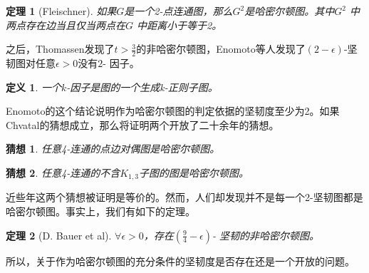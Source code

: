 \documentclass[a4paper,11pt]{book}
\newtheorem{theorem}{\textbf{定理}}[section]
\newtheorem{defination}{\textbf{定义}}[section]
\newtheorem{guess}{\textbf{猜想}}[section]
\begin{document}
\begin{theorem}[Fleischner] \K 如果$G$是一个2-点连通图，那么$G^2$是哈密尔顿图。其中$G^2$ 中两点存在边当且仅当两点在$G$ 中距离小于等于2。\end{theorem}

之后，Thomassen发现了$t>\frac{3}{2}$的非哈密尔顿图，Enomoto等人发现了$(2-\epsilon)$-坚韧图对任意$\epsilon > 0$没有$2$- 因子。
\begin{defination} 一个$k$-因子是图的一个生成k-正则子图。\end{defination}

Enomoto的这个结论说明作为哈密尔顿图的判定依据的坚韧度至少为2。如果Chvatal的猜想成立，那么将证明两个开放了二十余年的猜想。
\begin{guess} \K 任意4-连通的点边对偶图是哈密尔顿图。\end{guess}
\begin{guess} \K 任意4-连通的不含$K_{1,3}$子图的图是哈密尔顿图。\end{guess}
近些年这两个猜想被证明是等价的。然而，人们却发现并不是每一个2-坚韧图都是哈密尔顿图。事实上，我们有如下的定理。

\begin{theorem}[D. Bauer et al] \K $\forall \epsilon > 0$，存在$(\frac{9}{4}-\epsilon)$- 坚韧的非哈密尔顿图。\end{theorem}

所以，关于作为哈密尔顿图的充分条件的坚韧度是否存在还是一个开放的问题。
\end{document}
